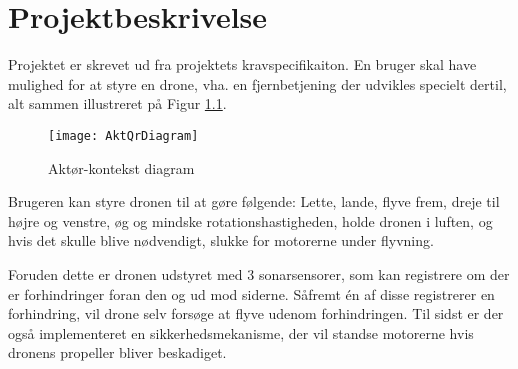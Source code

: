 \documentclass[Main]{subfiles}
\begin{document}
		
	

\chapter{Projektbeskrivelse}

Projektet er skrevet ud fra projektets kravspecifikaiton\cite{Kravspec}.
En bruger skal have mulighed for at styre en drone, vha. en fjernbetjening der udvikles specielt dertil, alt sammen illustreret på Figur \ref{Fig:Aktor-oversigt}.

\begin{figure}[H]
\centering
\texttt{[image: AktQrDiagram]}
\caption{Aktør-kontekst diagram}
\label{Fig:Aktor-oversigt}
\end{figure}

Brugeren kan styre dronen til at gøre følgende: Lette, lande, flyve frem, dreje til højre og venstre, øg og mindske rotationshastigheden, holde dronen i luften, og hvis det skulle blive nødvendigt, slukke for motorerne under flyvning.

Foruden dette er dronen udstyret med 3 sonarsensorer, som kan registrere om der er forhindringer foran den og ud mod siderne.
Såfremt én af disse registrerer en forhindring, vil drone selv forsøge at flyve udenom forhindringen.
Til sidst er der også implementeret en sikkerhedsmekanisme, der vil standse motorerne hvis dronens propeller bliver beskadiget.
\end{document}
